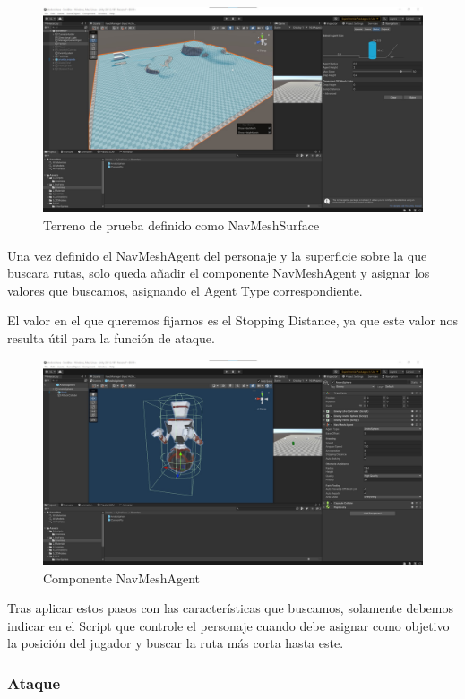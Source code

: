 \documentclass[12pt,spanish]{article}
\begin{document}
\begin{figure}[h!]
 \centering
 \includegraphics[width = 0.75\linewidth]{enemies/AndroSphere/NavigationWindow.jpg}
 \caption{Terreno de prueba definido como NavMeshSurface}
 \label{fig:t2}
\end{figure}

    Una vez definido el NavMeshAgent del personaje y la superficie sobre la que buscara rutas, solo queda añadir el componente NavMeshAgent y asignar los valores que buscamos, asignando el Agent Type correspondiente.

    El valor en el que queremos fijarnos es el Stopping Distance, ya que este valor nos resulta útil para la función de ataque.

\begin{figure}[h!]
 \centering
 \includegraphics[width = 0.75\linewidth]{enemies/AndroSphere/AndroSphere_NavMeshAgent.jpg}
 \caption{Componente NavMeshAgent}
 \label{fig:t2}
\end{figure}


    Tras aplicar estos pasos con las características que buscamos, solamente debemos indicar en el Script que controle el personaje cuando debe asignar como objetivo la posición del jugador y buscar la ruta más corta hasta este.
    
\newpage

\subsubsection{Ataque}
\end{document}
